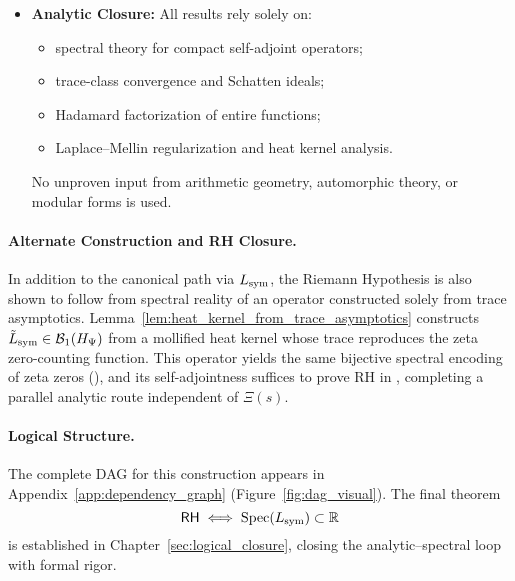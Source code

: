 \begin{itemize}
  \item \textbf{Analytic Closure:}  
  All results rely solely on:
  \begin{itemize}
    \item spectral theory for compact self-adjoint operators;
    \item trace-class convergence and Schatten ideals;
    \item Hadamard factorization of entire functions;
    \item Laplace–Mellin regularization and heat kernel analysis.
  \end{itemize}
  No unproven input from arithmetic geometry, automorphic theory, or modular forms is used.
\end{itemize}

\paragraph{Alternate Construction and RH Closure.}
In addition to the canonical path via \( L_{\mathrm{sym}} \), the Riemann Hypothesis is also shown to follow from spectral reality of an operator constructed solely from trace asymptotics. Lemma~\ref{lem:heat_kernel_from_trace_asymptotics} constructs \( \tilde{L}_{\mathrm{sym}} \in \mathcal{B}_1(H_{\Psi}) \) from a mollified heat kernel whose trace reproduces the zeta zero-counting function. This operator yields the same bijective spectral encoding of zeta zeros (), and its self-adjointness suffices to prove RH in , completing a parallel analytic route independent of \( \Xi(s) \).

\paragraph{Logical Structure.}
The complete DAG for this construction appears in Appendix~\ref{app:dependency_graph} (Figure~\ref{fig:dag_visual}). The final theorem
\[
\mathsf{RH} \iff \operatorname{Spec}(L_{\mathrm{sym}}) \subset \mathbb{R}
\]
is established in Chapter~\ref{sec:logical_closure}, closing the analytic–spectral loop with formal rigor.
